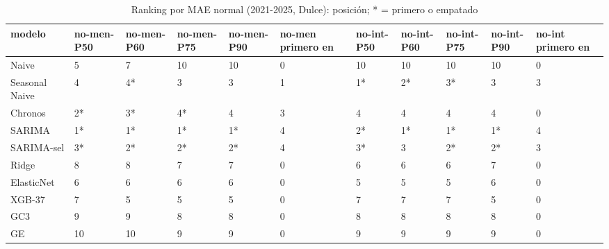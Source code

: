 \begin{table}[H]
\centering
\small
\caption{Ranking por MAE normal (2021-2025, Dulce): posición; * = primero o empatado}
\label{tab:T08_ranking_normal_principal_2021_2025_dulce}
\begin{tabular}{lllllllllll}
\toprule
modelo & no-men-P50 & no-men-P60 & no-men-P75 & no-men-P90 & no-men primero en & no-int-P50 & no-int-P60 & no-int-P75 & no-int-P90 & no-int primero en \\
\midrule
Naive & 5 & 7 & 10 & 10 & 0 & 10 & 10 & 10 & 10 & 0 \\
Seasonal Naive & 4 & 4* & 3 & 3 & 1 & 1* & 2* & 3* & 3 & 3 \\
Chronos & 2* & 3* & 4* & 4 & 3 & 4 & 4 & 4 & 4 & 0 \\
SARIMA & 1* & 1* & 1* & 1* & 4 & 2* & 1* & 1* & 1* & 4 \\
SARIMA-sel & 3* & 2* & 2* & 2* & 4 & 3* & 3 & 2* & 2* & 3 \\
Ridge & 8 & 8 & 7 & 7 & 0 & 6 & 6 & 6 & 7 & 0 \\
ElasticNet & 6 & 6 & 6 & 6 & 0 & 5 & 5 & 5 & 6 & 0 \\
XGB-37 & 7 & 5 & 5 & 5 & 0 & 7 & 7 & 7 & 5 & 0 \\
GC3 & 9 & 9 & 8 & 8 & 0 & 8 & 8 & 8 & 8 & 0 \\
GE & 10 & 10 & 9 & 9 & 0 & 9 & 9 & 9 & 9 & 0 \\
\bottomrule
\end{tabular}
\end{table}
